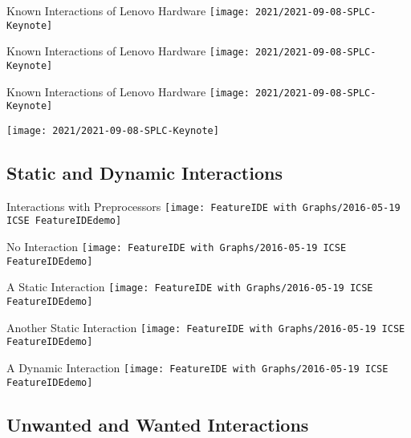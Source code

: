 \documentclass[
	aspectratio=169, %
	8pt, %
	handout, %
]{beamer}
\begin{document}
\begin{frame}{Known Interactions of Lenovo Hardware}
	\centering\texttt{[image: 2021/2021-09-08-SPLC-Keynote]}
\end{frame}
\begin{frame}{Known Interactions of Lenovo Hardware}
	\centering\texttt{[image: 2021/2021-09-08-SPLC-Keynote]}
\end{frame}
\begin{frame}{Known Interactions of Lenovo Hardware}
	\centering\texttt{[image: 2021/2021-09-08-SPLC-Keynote]}
\end{frame}
\begin{frame}
	\centering\texttt{[image: 2021/2021-09-08-SPLC-Keynote]}
\end{frame}

\subsection{Static and Dynamic Interactions}
\begin{frame}{Interactions with Preprocessors}
	\centering
	\texttt{[image: FeatureIDE with Graphs/2016-05-19 ICSE FeatureIDEdemo]}
\end{frame}
\begin{frame}{No Interaction}
	\centering
	\texttt{[image: FeatureIDE with Graphs/2016-05-19 ICSE FeatureIDEdemo]}
\end{frame}
\begin{frame}{A Static Interaction}
	\centering
	\texttt{[image: FeatureIDE with Graphs/2016-05-19 ICSE FeatureIDEdemo]}
\end{frame}
\begin{frame}{Another Static Interaction}
	\centering
	\texttt{[image: FeatureIDE with Graphs/2016-05-19 ICSE FeatureIDEdemo]}
\end{frame}
\begin{frame}{A Dynamic Interaction}
	\centering
	\texttt{[image: FeatureIDE with Graphs/2016-05-19 ICSE FeatureIDEdemo]}
\end{frame}

\subsection{Unwanted and Wanted Interactions} %
\end{document}
